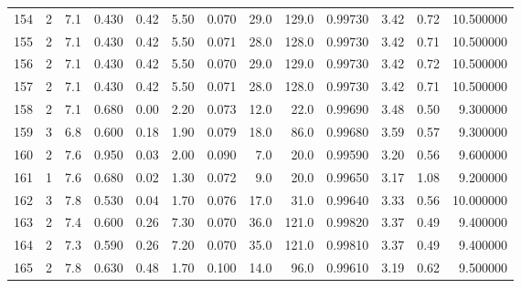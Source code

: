 \begin{tabular}{lrrrrrrrrrrrr}
154  &        2 &            7.1 &             0.430 &         0.42 &            5.50 &      0.070 &                 29.0 &                 129.0 &  0.99730 &  3.42 &       0.72 &  10.500000 \\
155  &        2 &            7.1 &             0.430 &         0.42 &            5.50 &      0.071 &                 28.0 &                 128.0 &  0.99730 &  3.42 &       0.71 &  10.500000 \\
156  &        2 &            7.1 &             0.430 &         0.42 &            5.50 &      0.070 &                 29.0 &                 129.0 &  0.99730 &  3.42 &       0.72 &  10.500000 \\
157  &        2 &            7.1 &             0.430 &         0.42 &            5.50 &      0.071 &                 28.0 &                 128.0 &  0.99730 &  3.42 &       0.71 &  10.500000 \\
158  &        2 &            7.1 &             0.680 &         0.00 &            2.20 &      0.073 &                 12.0 &                  22.0 &  0.99690 &  3.48 &       0.50 &   9.300000 \\
159  &        3 &            6.8 &             0.600 &         0.18 &            1.90 &      0.079 &                 18.0 &                  86.0 &  0.99680 &  3.59 &       0.57 &   9.300000 \\
160  &        2 &            7.6 &             0.950 &         0.03 &            2.00 &      0.090 &                  7.0 &                  20.0 &  0.99590 &  3.20 &       0.56 &   9.600000 \\
161  &        1 &            7.6 &             0.680 &         0.02 &            1.30 &      0.072 &                  9.0 &                  20.0 &  0.99650 &  3.17 &       1.08 &   9.200000 \\
162  &        3 &            7.8 &             0.530 &         0.04 &            1.70 &      0.076 &                 17.0 &                  31.0 &  0.99640 &  3.33 &       0.56 &  10.000000 \\
163  &        2 &            7.4 &             0.600 &         0.26 &            7.30 &      0.070 &                 36.0 &                 121.0 &  0.99820 &  3.37 &       0.49 &   9.400000 \\
164  &        2 &            7.3 &             0.590 &         0.26 &            7.20 &      0.070 &                 35.0 &                 121.0 &  0.99810 &  3.37 &       0.49 &   9.400000 \\
165  &        2 &            7.8 &             0.630 &         0.48 &            1.70 &      0.100 &                 14.0 &                  96.0 &  0.99610 &  3.19 &       0.62 &   9.500000 \\

\end{tabular}
